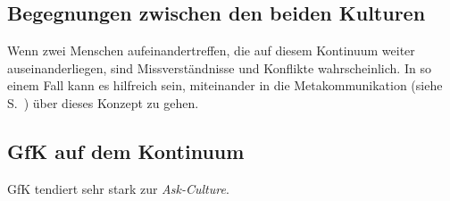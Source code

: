\subsection{Begegnungen zwischen den beiden Kulturen}

Wenn zwei Menschen aufeinandertreffen, die auf diesem Kontinuum weiter auseinanderliegen, sind Missverständnisse und Konflikte wahrscheinlich. In so einem Fall kann es hilfreich sein, miteinander in die Metakommunikation (siehe S.~\pageref{metakommunikation}) über dieses Konzept zu gehen.

\subsection{GfK auf dem Kontinuum}

GfK tendiert sehr stark zur \emph{Ask-Culture}.
